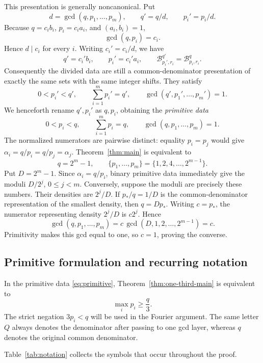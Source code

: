 \documentclass[11pt]{article}
\theoremstyle{definition}
\theoremstyle{remark}
\newcommand{\B}{\mathcal B}
\begin{document}
This presentation is generally noncanonical.  Put
\[
 d=\gcd(q,p_1,\ldots,p_m),\qquad q'=q/d,\qquad p_i'=p_i/d.
\]
Because \(q=c_i b_i\), \(p_i=c_i a_i\), and \((a_i,b_i)=1\),
\[
 \gcd(q,p_i)=c_i.
\]
Hence \(d\mid c_i\) for every \(i\).  Writing \(c_i'=c_i/d\), we have
\[
 q'=c_i'b_i,
 \qquad p_i'=c_i'a_i,
 \qquad
 \B^{q'}_{p_i',r_i}=\B^q_{p_i,r_i}.
\]
Consequently the divided data are still a common-denominator presentation
of exactly the same sets with the same integer shifts.  They satisfy
\[
 0<p_i'<q',\qquad \sum_{i=1}^m p_i'=q',\qquad
 \gcd(q',p_1',\ldots,p_m')=1.
\]
We henceforth rename \(q',p_i'\) as \(q,p_i\), obtaining the
\emph{primitive data}
\begin{equation}\label{eq:primitive}
 0<p_i<q,\qquad \sum_{i=1}^m p_i=q,\qquad
 \gcd(q,p_1,\ldots,p_m)=1.
\end{equation}
The normalized numerators are pairwise distinct: equality \(p_i=p_j\)
would give \(\alpha_i=q/p_i=q/p_j=\alpha_j\).
Theorem~\ref{thm:main} is equivalent to
\[
 q=2^m-1,\qquad
 \{p_1,\ldots,p_m\}=\{1,2,4,\ldots,2^{m-1}\}.
\]
Put \(D=2^m-1\).  Since
\(\alpha_i=q/p_i\), binary primitive data immediately give the moduli
\(D/2^j\), \(0\le j<m\).  Conversely, suppose the moduli are precisely
these numbers.  Their densities are \(2^j/D\).  If \(p_*/q=1/D\) is the
common-denominator representation of the smallest density, then
\(q=Dp_*\).  Writing \(c=p_*\), the numerator representing density
\(2^j/D\) is \(c2^j\).  Hence
\[
 \gcd(q,p_1,\ldots,p_m)
 =c\,\gcd(D,1,2,\ldots,2^{m-1})=c.
\]
Primitivity makes this gcd equal to one, so \(c=1\), proving the converse.

\subsection{Primitive formulation and recurring notation}

In the primitive data \eqref{eq:primitive}, Theorem~\ref{thm:one-third-main}
is equivalent to
\[
 \max_i p_i\ge\frac q3.
\]
The strict negation \(3p_i<q\) will be used in the Fourier argument.  The
same letter \(Q\) always denotes the denominator after passing to one gcd
layer, whereas \(q\) denotes the original common denominator.

Table~\ref{tab:notation} collects the symbols that occur throughout the
proof.
\end{document}
